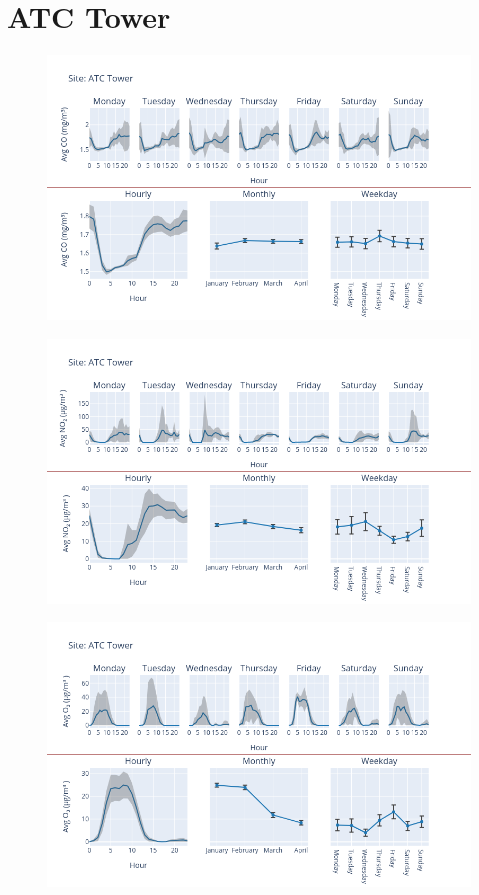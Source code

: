 \documentclass[12pt, oneside]{book}
\begin{document}
{\section{ATC Tower}
{\begin{figure}[H] 
 \centering 
\includegraphics[width=.88\textwidth, keepaspectratio]{image50} 
 \end{figure}}{} 

{\begin{figure}[H] 
 \centering 
\includegraphics[width=.88\textwidth, keepaspectratio]{image51} 
 \end{figure}}{} 

{\begin{figure}[H] 
 \centering 
\includegraphics[width=.88\textwidth, keepaspectratio]{image52} 
 \end{figure}}{} 

}
\end{document}
